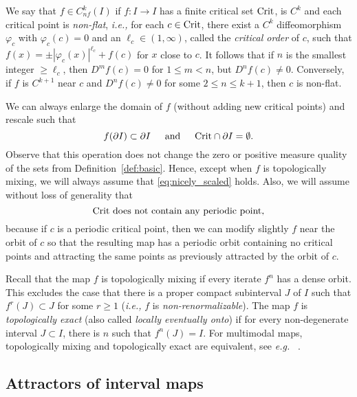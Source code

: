 \documentclass[12pt, psamsfonts, reqno]{amsart}
\begin{document}
We say that $f \in C^k_{nf}(I)$ if $f:I \to I$ has a finite
critical set ${\mathop{\rm Crit}\nolimits}$, is $C^k$ and each critical point is {\em
non-flat}, {{\em i.e., }} for each $c \in {\mathop{\rm Crit}\nolimits}$, there exist a $C^k$
diffeomorphism $\varphi_c$ with $\varphi_c(c)=0$ and an $\ell_c
\in (1, \infty)$, called the {\em critical order} of $c$, such
that $f(x)=\pm|\varphi_c(x)|^{\ell_c} + f(c)$ for $x$ close to
$c$. It follows that if $n$ is the smallest integer $\geq \ell_c$,
then $D^m f(c)= 0$ for $1 \leq m < n$, but $D^n f(c) \neq 0$.
Conversely, if $f$ is $C^{k+1}$ near $c$ and $D^n f(c) \neq 0$ for
some $2\leq n\leq k+1$, then $c$ is non-flat.

We can always enlarge
the domain of $f$ (without adding new critical points) and
rescale such that
\begin{equation} \label{eq:nicely_scaled}
 \text{$f(\partial I)\subset \partial I$ \;\;\; and \;\;\; ${\mathop{\rm Crit}\nolimits}\cap \partial
 I=\emptyset$.}
\end{equation}
Observe that this operation does not change the zero or positive
measure quality of the sets from Definition~\ref{def:basic}.
Hence, except when $f$ is topologically mixing, we will
always assume that \eqref{eq:nicely_scaled} holds. Also, we will
assume without loss of generality that
\begin{equation}
 \label{nonperiodic}
 \text{${\mathop{\rm Crit}\nolimits}$ does not contain any periodic point,}
\end{equation}
because if $c$ is a periodic critical point, then we can modify
slightly $f$ near the orbit of $c$ so that the resulting map has a
periodic orbit containing no critical points and attracting the
same points as previously attracted by the orbit of $c$.

Recall that the map $f$ is topologically mixing if every iterate
$f^n$ has a dense orbit. This excludes the case that there is a
proper compact subinterval $J$ of $I$ such that $f^r(J)\subset J$
for some $r\geq 1$ ({{\em i.e., }} $f$ is \emph{non-renormalizable}). The map
$f$ is \emph{topologically exact}  (also called \emph{locally
eventually onto}) if for every non-degenerate interval $J \subset
I$, there is $n$ such that $f^n(J) = I$. For multimodal maps,
topologically mixing and topologically exact are equivalent, see
{{\em e.g.~}} \cite[pp. 157--158]{BlCo}.

\subsection{Attractors of interval maps}\label{subsec:attractors}
\end{document}
